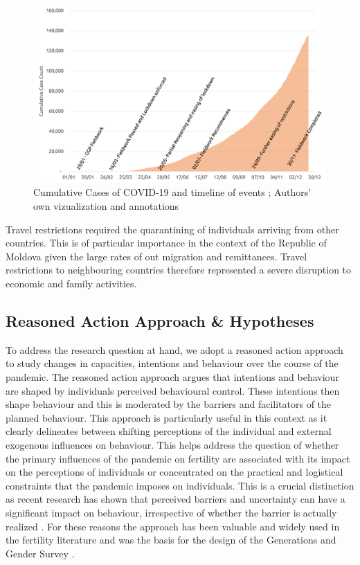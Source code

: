 \documentclass[10pt,letterpaper]{article}
\begin{document}
\begin{figure}
\centering
\includegraphics[width=\textwidth]{fig2.png}
\caption{Cumulative Cases of COVID-19 and timeline of events  \cite{owidcoronavirus}; 
Authors' own vizualization and annotations}
\label{fig:timeline}
\end{figure}

Travel restrictions required the quarantining of individuals arriving from other countries. This is of particular importance in the context of the Republic of Moldova given the large rates of out migration and remittances. Travel restrictions to neighbouring countries therefore represented a severe disruption to economic and family activities. 

\subsection*{Reasoned Action Approach \& Hypotheses}

To address the research question at hand, we adopt a reasoned action approach \cite{fishbein2011predicting} to study changes in capacities, intentions and behaviour over the course of the pandemic. The reasoned action approach argues that intentions and behaviour are shaped by individuals perceived behavioural control. These intentions then shape behaviour and this is moderated by the barriers and facilitators of the planned behaviour. This approach is particularly useful in this context as it clearly delineates between shifting perceptions of the individual and external exogenous influences on behaviour. This helps address the question of whether the primary influences of the pandemic on fertility are associated with its impact on the perceptions of individuals or concentrated on the practical and logistical constraints that the pandemic imposes on individuals.  This is a crucial distinction as recent research has shown that perceived barriers and uncertainty can have a significant impact on behaviour, irrespective of whether the barrier is actually realized \cite{vignoli2020reflection}. For these reasons the approach has been valuable and widely used in the fertility literature and was the basis for the design of the Generations and Gender Survey \cite{gauthier2018generations}.
\end{document}
